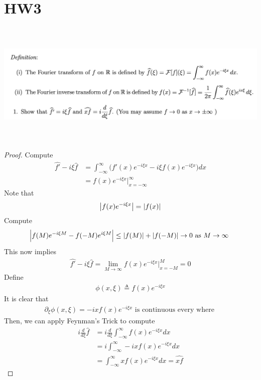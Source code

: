 \documentclass{report}
\begin{document}
\section{HW3}
\begin{question}{}{}
\includegraphics[height=6cm,width=18cm]{hw3q1}
\end{question}
\begin{proof}
Compute 
\begin{align*}
\hat{f'}-i\xi \hat{f}&=\int_{-\infty}^{\infty}\big( f'(x)e^{-i\xi x}-i\xi f(x)e^{-i \xi x}\big)dx\\
&=f(x)e^{-i\xi x}\Big|_{x=-\infty}^{\infty}
\end{align*}
Note that 
\begin{align*}
\left|f(x)e^{-i\xi x}\right|= \left|f(x)\right|
\end{align*}
Compute 
\begin{align*}
 \Big|f(M)e^{-i\xi M}-f(-M)e^{i \xi M} \Big|\leq  \left|f(M)\right|+ \left|f(-M)\right|\to 0\text{ as $M\to \infty$ }\\
\end{align*}
This now implies  
\begin{align*}
\hat{f'}-i \xi \hat{f}=\lim_{M\to \infty}f(x)e^{-i \xi x}\big|_{x=-M}^{M}=0
\end{align*}
Define 
 \begin{align*}
\phi(x,\xi)\triangleq f(x)e^{-i\xi x}
\end{align*}
It is clear that 
\begin{align*}
\partial_{\xi}\phi(x,\xi)=-ixf(x)e^{- i\xi x}\text{ is continuous every where }
\end{align*}
Then, we can apply Feynman's Trick to compute
\begin{align*}
i \frac{d}{d\xi}\hat{f}&= i \frac{d}{d\xi}\int_{-\infty}^{\infty}f(x)e^{-i\xi x}dx\\
&=i \int_{-\infty}^{\infty}-ix f(x)e^{-i\xi x}dx\\
&=\int_{-\infty}^{\infty}xf(x)e^{-i\xi x}dx=\widehat{xf}
\end{align*}
\end{proof}
\end{document}
